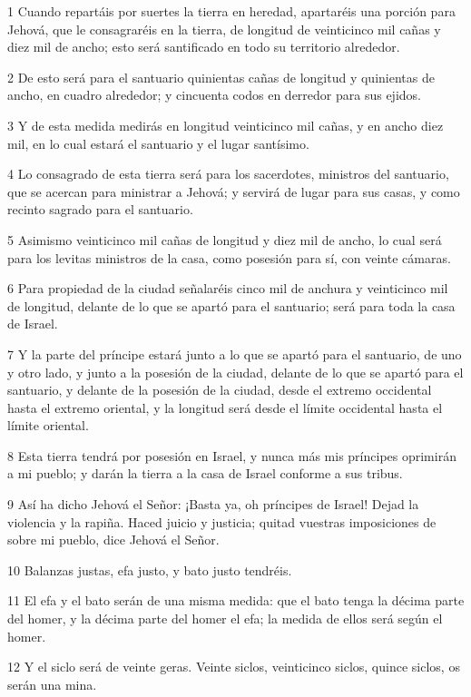 \par 1 Cuando repartáis por suertes la tierra en heredad, apartaréis una porción para Jehová, que le consagraréis en la tierra, de longitud de veinticinco mil cañas y diez mil de ancho; esto será santificado en todo su territorio alrededor.
\par 2 De esto será para el santuario quinientas cañas de longitud y quinientas de ancho, en cuadro alrededor; y cincuenta codos en derredor para sus ejidos.
\par 3 Y de esta medida medirás en longitud veinticinco mil cañas, y en ancho diez mil, en lo cual estará el santuario y el lugar santísimo.
\par 4 Lo consagrado de esta tierra será para los sacerdotes, ministros del santuario, que se acercan para ministrar a Jehová; y servirá de lugar para sus casas, y como recinto sagrado para el santuario.
\par 5 Asimismo veinticinco mil cañas de longitud y diez mil de ancho, lo cual será para los levitas ministros de la casa, como posesión para sí, con veinte cámaras.
\par 6 Para propiedad de la ciudad señalaréis cinco mil de anchura y veinticinco mil de longitud, delante de lo que se apartó para el santuario; será para toda la casa de Israel.
\par 7 Y la parte del príncipe estará junto a lo que se apartó para el santuario, de uno y otro lado, y junto a la posesión de la ciudad, delante de lo que se apartó para el santuario, y delante de la posesión de la ciudad, desde el extremo occidental hasta el extremo oriental, y la longitud será desde el límite occidental hasta el límite oriental.
\par 8 Esta tierra tendrá por posesión en Israel, y nunca más mis príncipes oprimirán a mi pueblo; y darán la tierra a la casa de Israel conforme a sus tribus.
\par 9 Así ha dicho Jehová el Señor: ¡Basta ya, oh príncipes de Israel! Dejad la violencia y la rapiña. Haced juicio y justicia; quitad vuestras imposiciones de sobre mi pueblo, dice Jehová el Señor.
\par 10 Balanzas justas, efa justo, y bato justo tendréis. 
\par 11 El efa y el bato serán de una misma medida: que el bato tenga la décima parte del homer, y la décima parte del homer el efa; la medida de ellos será según el homer.
\par 12 Y el siclo será de veinte geras. Veinte siclos, veinticinco siclos, quince siclos, os serán una mina.
